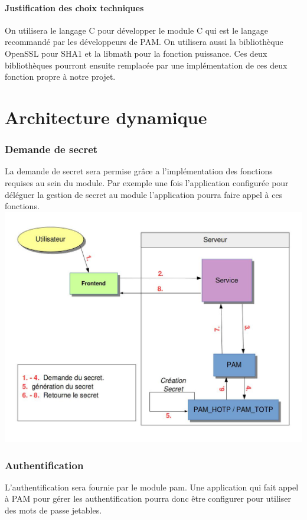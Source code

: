 \documentclass{"../../res/univ-projet"}
\begin{document}
\subsection{Justification des choix techniques}
On utilisera le langage C pour développer le module C qui est le langage recommandé par
les développeurs de PAM. On utilisera aussi la bibliothèque OpenSSL pour SHA1 et la libmath
pour la fonction puissance. Ces deux bibliothèques pourront ensuite remplacée par une implémentation
de ces deux fonction propre à notre projet.

\part*{Architecture dynamique}
\section{Demande de secret}
La demande de secret sera permise grâce a l'implémentation des fonctions requises au sein du
module. Par exemple une fois l'application configurée pour déléguer la gestion de secret au
module l'application pourra faire appel à ces fonctions.
\newline
\includegraphics[width=\textwidth]{../graphics/association.jpg}

\section{Authentification}
L'authentification sera fournie par le module pam. Une application qui fait appel à PAM pour gérer
les authentification pourra donc être configurer pour utiliser des mots de passe jetables.
\end{document}
